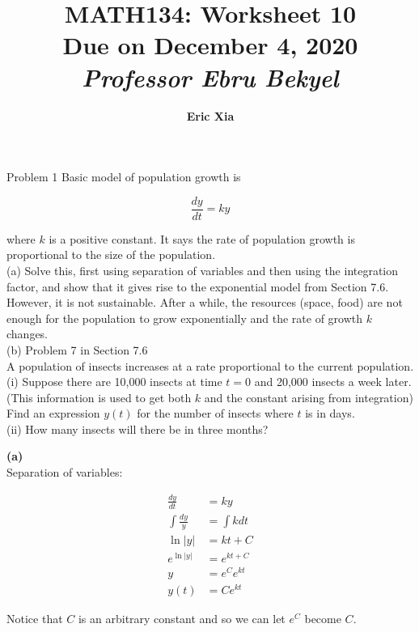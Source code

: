 \documentclass{article}
\title{
    \vspace{2in}
    \textmd{\textbf{MATH134: Worksheet 10}}\\
    \normalsize\vspace{0.1in}\small{Due on December 4, 2020}\\
    \vspace{0.1in}\large{\textit{Professor Ebru Bekyel}}
    \vspace{3in}
}
\author{\textbf{Eric Xia}}
\date{}
\begin{document}
    \maketitle
    \pagebreak

    \thispagestyle{2}


    \begin{tbhtheorem}{Problem 1}
        Basic model of population growth is

        \[
            \frac{dy}{dt} = ky
        \]

        where $k$ is a positive constant. It says the rate of population growth is proportional to the size of the population. \\
        (a) Solve this, first using separation of variables and then using the integration factor, and show that it gives rise to the exponential model from Section 7.6. However, it is not sustainable. After a while,
        the resources (space, food) are not enough for the population to grow exponentially and the rate of growth $k$ changes. \\

        (b) Problem 7 in Section 7.6 \\
        A population of insects increases at a rate proportional to the current population. \\
        (i) Suppose there are 10,000 insects at time $t=0$ and 20,000 insects a week later. (This information is used to get both $k$ and the constant arising from integration) Find an expression $y(t)$ for the number
        of insects where $t$ is in days. \\
        (ii) How many insects will there be in three months?
    \end{tbhtheorem}

    \textbf{(a)} \\
    Separation of variables:

    \begin{align*}
        \frac{dy}{dt}       &= ky \\
        \int \frac{dy}{y}   &= \int k dt \\
        \ln{|y|}            &= kt + C \\
        e^{\ln|y|}          &= e^{kt + C} \\
        y                   &= e^C e^{kt} \\
        y(t)                   &= Ce^{kt}
    \end{align*}

    Notice that $C$ is an arbitrary constant and so we can let $e^C$ become $C$. \\
\end{document}

